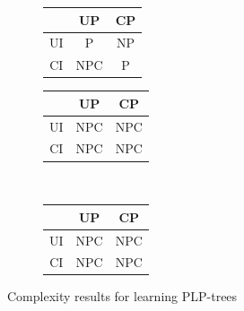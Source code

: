  {
  \begin{figure}[!ht]
    \centering
    \begin{subfigure}[b]{0.45\textwidth}
      \centering
      \begin{tabular}[0.45\textwidth]{ | c | c | c | }
        \hline
           & UP & CP \\
        \hline
        UI & P & NP\\
        \hline
        CI & NPC\footnotemark & P  \\
        \hline
      \end{tabular}
      \caption{}
    \end{subfigure}
    \begin{subfigure}[b]{0.45\textwidth}
      \centering
      \begin{tabular}[0.45\textwidth]{ | c | c | c | }
        \hline
           & UP & CP \\
        \hline
        UI & NPC & NPC \\
        \hline
        CI & NPC & NPC \\
        \hline
      \end{tabular}
      \caption{}
    \end{subfigure} \\
    \begin{subfigure}[b]{0.45\textwidth}
      \centering
      \begin{tabular}[0.45\textwidth]{ | c | c | c | }
        \hline
           & UP & CP \\
        \hline
        UI & NPC\footnotemark & NPC \\
        \hline
        CI & NPC & NPC \\
        \hline
      \end{tabular}
      \caption{}
    \end{subfigure}
    \caption{Complexity results for learning PLP-trees}
  \end{figure}
}

